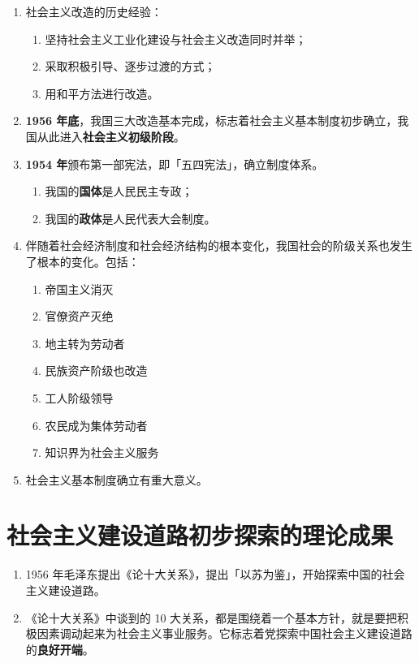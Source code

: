 \documentclass[UTF8]{ctexart}
\newcommand\Emph[2]{\colorbox{c#1-light}{\textcolor{c#1-emph}{\textbf{#2}}}}
\begin{document}
\begin{enumerate}[start=11]
    \item 社会主义改造的历史经验：
    \begin{enumerate}[label={\roman{enumii})}, start=1]
        \item 坚持社会主义工业化建设与社会主义改造同时并举；
        \item 采取积极引导、逐步过渡的方式；
        \item 用和平方法进行改造。
    \end{enumerate}
    \item \Emph{3}{1956 年底}，我国三大改造基本完成，标志着社会主义基本制度初步确立，我国从此进入\Emph{3}{社会主义初级阶段}。
    \item \Emph{3}{1954 年}颁布第一部宪法，即「五四宪法」，确立制度体系。
    \begin{enumerate}[label={\roman{enumii})}, start=1]
      \item 我国的\Emph{3}{国体}是人民民主专政；
      \item 我国的\Emph{3}{政体}是人民代表大会制度。
    \end{enumerate}
    \item 伴随着社会经济制度和社会经济结构的根本变化，我国社会的阶级关系也发生了根本的变化。包括：
    \begin{enumerate}[label={\roman{enumii})}, start=1]
        \item 帝国主义消灭
        \item 官僚资产灭绝
        \item 地主转为劳动者
        \item 民族资产阶级也改造
        \item 工人阶级领导
        \item 农民成为集体劳动者
        \item 知识界为社会主义服务
    \end{enumerate}
    \item 社会主义基本制度确立有重大意义。
\end{enumerate}

\newpage
{}
\BgThispage
\pagecolor{c4-med}
\section{社会主义建设道路初步探索的理论成果}\label{sec:4}
\begin{enumerate}[start=1]
  \item 1956 年毛泽东提出《论十大关系》，提出「以苏为鉴」，开始探索中国的社会主义建设道路。
  \item 《论十大关系》中谈到的 10 大关系，都是围绕着一个基本方针，就是要把积极因素调动起来为社会主义事业服务。它标志着党探索中国社会主义建设道路的\Emph{4}{良好开端}。
\end{enumerate}
\end{document}
